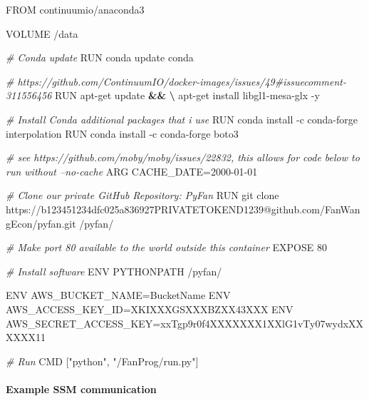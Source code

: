 \documentclass[
]{book}
\newenvironment{Shaded}{\begin{snugshade}}{\end{snugshade}}
\newcommand{\CommentTok}[1]{\textcolor[rgb]{0.56,0.35,0.01}{\textit{#1}}}
\newcommand{\ExtensionTok}[1]{#1}
\newcommand{\KeywordTok}[1]{\textcolor[rgb]{0.13,0.29,0.53}{\textbf{#1}}}
\newcommand{\NormalTok}[1]{#1}
\newcommand{\StringTok}[1]{\textcolor[rgb]{0.31,0.60,0.02}{#1}}
\begin{document}
\begin{Shaded}
\begin{Highlighting}[]
\ExtensionTok{FROM}\NormalTok{ continuumio/anaconda3}

\ExtensionTok{VOLUME}\NormalTok{ /data}

\CommentTok{# Conda update}
\ExtensionTok{RUN}\NormalTok{ conda update conda}

\CommentTok{# https://github.com/ContinuumIO/docker-images/issues/49#issuecomment-311556456}
\ExtensionTok{RUN}\NormalTok{ apt-get update }\KeywordTok{&&} \KeywordTok{\textbackslash{}}
    \ExtensionTok{apt-get}\NormalTok{ install libgl1-mesa-glx -y}

\CommentTok{# Install Conda additional packages that i use}
\ExtensionTok{RUN}\NormalTok{ conda install -c conda-forge interpolation}
\ExtensionTok{RUN}\NormalTok{ conda install -c conda-forge boto3}

\CommentTok{# see https://github.com/moby/moby/issues/22832, this allows for code below to run without --no-cache}
\ExtensionTok{ARG}\NormalTok{ CACHE_DATE=2000-01-01}

\CommentTok{# Clone our private GitHub Repository: PyFan}
\ExtensionTok{RUN}\NormalTok{ git clone https://b123451234dfc025a836927PRIVATETOKEND1239@github.com/FanWangEcon/pyfan.git /pyfan/}

\CommentTok{# Make port 80 available to the world outside this container}
\ExtensionTok{EXPOSE}\NormalTok{ 80}

\CommentTok{# Install software}
\ExtensionTok{ENV}\NormalTok{ PYTHONPATH /pyfan/}

\ExtensionTok{ENV}\NormalTok{ AWS_BUCKET_NAME=BucketName}
\ExtensionTok{ENV}\NormalTok{ AWS_ACCESS_KEY_ID=XKIXXXGSXXXBZXX43XXX}
\ExtensionTok{ENV}\NormalTok{ AWS_SECRET_ACCESS_KEY=xxTgp9r0f4XXXXXXX1XXlG1vTy07wydxXXXXXX11}

\CommentTok{# Run}
\ExtensionTok{CMD}\NormalTok{ [}\StringTok{"python"}\NormalTok{, }\StringTok{"/FanProg/run.py"}\NormalTok{]}
\end{Highlighting}
\end{Shaded}

\hypertarget{example-ssm-communication}{%
\paragraph{Example SSM communication}\label{example-ssm-communication}}
\end{document}
